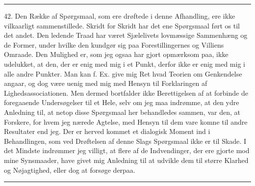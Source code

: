 \documentclass[12pt,a4paper,openany]{book}
\begin{document}
\begin{center}\rule{2cm}{0.4pt}\end{center}

42. Den Række af Spørgsmaal, som ere drøftede i denne Afhandling, ere ikke
vilkaarligt sammenstillede. Skridt for Skridt har det ene Spørgsmaal ført os
til det andet. Den ledende Traad har været Sjælelivets lovmæssige Sammenhæng og
de Former, under hvilke den kundgør sig paa Forestillingernes og Villiens
Omraade. Den Mulighed er, som jeg ogsaa har gjort opmærksom paa, ikke
udelukket, at den, der er enig med mig i et Punkt, derfor ikke er enig med mig
i alle andre Punkter. Man kan f. Ex. give mig Ret hvad Teorien om Genkendelse
angaar, og dog være uenig med mig med Hensyn til Forklaringen af
Lighedsassociationen. Men dermed bortfalder ikke Berettigelsen af at forbinde
de foregaaende Undersøgelser til et Hele, selv om jeg maa indrømme, at den ydre
Anledning til, at netop disse Spørgsmaal her behandledes sammen, var den, at
Forskere, for hvem jeg nærede Agtelse, med Hensyn til dem vare komne til andre
Resultater end jeg. Der er herved kommet et dialogisk Moment ind i
Behandlingen, som ved Drøftelsen af denne Slags Spørgsmaal ikke er til Skade. I
det Mindste indrømmer jeg villigt, at flere af de Indvendinger, der ere gjorte
mod mine Synsmaader, have givet mig Anledning til at udvikle dem til større
Klarhed og Nøjagtighed, eller dog at forsøge derpaa.

\begin{center}\rule{2cm}{0.4pt}\end{center}
\end{document}
